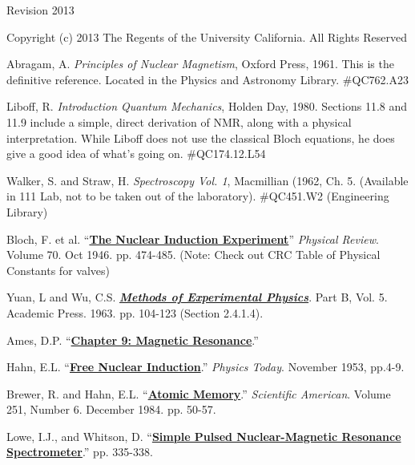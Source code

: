\documentclass{../lab}
\begin{document}
Revision 2013

Copyright (c) 2013 The Regents of the University California. All Rights Reserved

\begin{thebibliography}{}
\label{References}
     Abragam, A. \emph{Principles of Nuclear Magnetism}, Oxford Press, 1961. This is the definitive reference.  Located in the Physics and Astronomy Library. \#QC762.A23

     Liboff, R. \emph{Introduction Quantum Mechanics}, Holden Day, 1980. Sections 11.8 and 11.9 include a simple, direct derivation of NMR, along with a physical interpretation. While Liboff does not use the classical Bloch equations, he does give a good idea of what's going on. \#QC174.12.L54

     Walker, S. and Straw, H. \emph{Spectroscopy Vol. 1}, Macmillian (1962, Ch. 5. (Available in 111 Lab, not to be taken out of the laboratory). \#QC451.W2 (Engineering Library)

     Bloch, F. et al. ``\href{https://drive.google.com/file/d/150VUPrnRdnqvvN7rGG_8Z76ZUhHEpjO2/view?usp=drive_link}{\textbf{The Nuclear Induction Experiment}}'' \emph{Physical Review}. Volume 70. Oct 1946. pp. 474-485. (Note: Check out CRC Table of Physical Constants for valves)

     Yuan, L and Wu, C.S. \href{https://berkeley-physics111b.github.io/assets/pdf/oldwebsitestructure/NMR/References/01-Methods_of_Experimental_Physics.pdf}{\textbf{\emph{Methods of Experimental Physics}}}. Part B, Vol. 5. Academic Press. 1963. pp. 104-123 (Section 2.4.1.4).

     Ames, D.P. ``\href{https://drive.google.com/file/d/1LzKfDPAKH5yo98fQn4m7hIxqyNWHQ1k2/view?usp=drive_link}{\textbf{Chapter 9: Magnetic Resonance}}.''

     Hahn, E.L.
    ``\href{https://drive.google.com/file/d/1JXG-miF6qqUWhtPm3djeslhj8eFAj8vv/view?usp=drive_link}{\textbf{Free Nuclear Induction}}.'' \emph{Physics Today}. November 1953, pp.4-9.

     Brewer, R. and Hahn, E.L. ``\href{https://drive.google.com/file/d/1kVWjPItFYgankZxcJc3GxnyrP3RmcFce/view?usp=drive_link}{\textbf{Atomic Memory}}.'' \emph{Scientific American}. Volume 251, Number 6. December 1984. pp. 50-57.

     Lowe, I.J., and Whitson, D. ``\href{https://drive.google.com/file/d/1Xh6okVPwYjqGlIIjAUs-aM7aHxwJ_Ddu/view?usp=drive_link}{\textbf{Simple Pulsed Nuclear-Magnetic Resonance Spectrometer}}.'' pp. 335-338.


\end{thebibliography}
\end{document}
